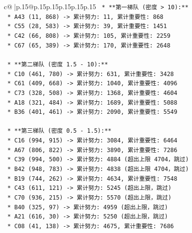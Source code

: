 \documentclass{article}
\begin{document}
{\begin{supertabular}{c@{$\;$}|p{.15\linewidth}@{}p{.15\linewidth}p{.15\linewidth}p{.15\linewidth}p{.15\linewidth}p{.15\linewidth}}
{{{\texttt{    *   **第一梯队 (密度 > 10):**} \\
\texttt{        *   A43 (11, 868) {-}> 累计努力: 11, 累计重要性: 868} \\
\texttt{        *   C55 (28, 583) {-}> 累计努力: 39, 累计重要性: 1451} \\
\texttt{        *   C42 (66, 808) {-}> 累计努力: 105, 累计重要性: 2259} \\
\texttt{        *   C67 (65, 389) {-}> 累计努力: 170, 累计重要性: 2648} \\
\\ 
\texttt{    *   **第二梯队 (密度 1.5 {-} 10):**} \\
\texttt{        *   C10 (461, 780) {-}> 累计努力: 631, 累计重要性: 3428} \\
\texttt{        *   C61 (409, 668) {-}> 累计努力: 1040, 累计重要性: 4096} \\
\texttt{        *   C73 (328, 508) {-}> 累计努力: 1368, 累计重要性: 4604} \\
\texttt{        *   A18 (321, 484) {-}> 累计努力: 1689, 累计重要性: 5088} \\
\texttt{        *   B36 (401, 461) {-}> 累计努力: 2090, 累计重要性: 5549} \\
\\ 
\texttt{    *   **第三梯队 (密度 0.5 {-} 1.5):**} \\
\texttt{        *   C16 (994, 915) {-}> 累计努力: 3084, 累计重要性: 6464} \\
\texttt{        *   A67 (806, 822) {-}> 累计努力: 3890, 累计重要性: 7286} \\
\texttt{        *   C39 (994, 500) {-}> 累计努力: 4884 (超出上限 4704，跳过)} \\
\texttt{        *   B42 (948, 783) {-}> 累计努力: 4838 (超出上限 4704，跳过)} \\
\texttt{        *   B19 (744, 262) {-}> 累计努力: 4634, 累计重要性: 7548} \\
\texttt{        *   C43 (611, 121) {-}> 累计努力: 5245 (超出上限，跳过)} \\
\texttt{        *   C70 (936, 215) {-}> 累计努力: 5570 (超出上限，跳过)} \\
\texttt{        *   B40 (325, 97) {-}> 累计努力: 4959 (超出上限，跳过)} \\
\texttt{        *   A21 (616, 30) {-}> 累计努力: 5250 (超出上限，跳过)} \\
\texttt{        *   C08 (41, 138) {-}> 累计努力: 4675, 累计重要性: 7686} \\
\\ 
}}}
\end{supertabular}}
\end{document}
